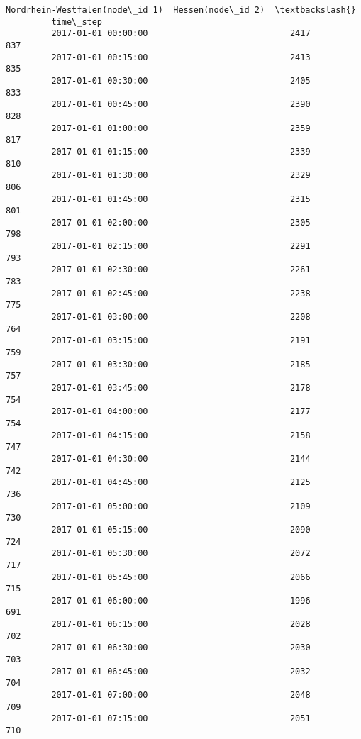 \documentclass[11pt]{article}
\begin{document}
\begin{Verbatim}[commandchars=\\\{\}]
                              Nordrhein-Westfalen(node\_id 1)  Hessen(node\_id 2)  \textbackslash{}
         time\_step                                                                
         2017-01-01 00:00:00                            2417                837   
         2017-01-01 00:15:00                            2413                835   
         2017-01-01 00:30:00                            2405                833   
         2017-01-01 00:45:00                            2390                828   
         2017-01-01 01:00:00                            2359                817   
         2017-01-01 01:15:00                            2339                810   
         2017-01-01 01:30:00                            2329                806   
         2017-01-01 01:45:00                            2315                801   
         2017-01-01 02:00:00                            2305                798   
         2017-01-01 02:15:00                            2291                793   
         2017-01-01 02:30:00                            2261                783   
         2017-01-01 02:45:00                            2238                775   
         2017-01-01 03:00:00                            2208                764   
         2017-01-01 03:15:00                            2191                759   
         2017-01-01 03:30:00                            2185                757   
         2017-01-01 03:45:00                            2178                754   
         2017-01-01 04:00:00                            2177                754   
         2017-01-01 04:15:00                            2158                747   
         2017-01-01 04:30:00                            2144                742   
         2017-01-01 04:45:00                            2125                736   
         2017-01-01 05:00:00                            2109                730   
         2017-01-01 05:15:00                            2090                724   
         2017-01-01 05:30:00                            2072                717   
         2017-01-01 05:45:00                            2066                715   
         2017-01-01 06:00:00                            1996                691   
         2017-01-01 06:15:00                            2028                702   
         2017-01-01 06:30:00                            2030                703   
         2017-01-01 06:45:00                            2032                704   
         2017-01-01 07:00:00                            2048                709   
         2017-01-01 07:15:00                            2051                710   

\end{Verbatim}
\end{document}

